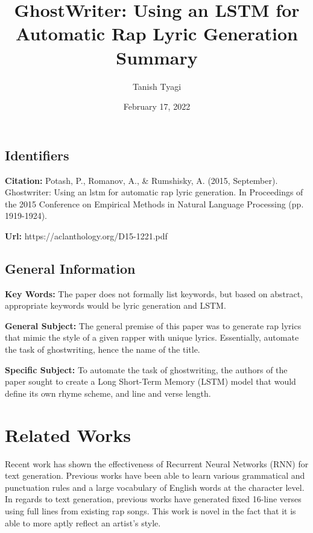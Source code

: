 \documentclass{article}
\title{\textbf{GhostWriter: Using an LSTM for Automatic Rap Lyric Generation Summary}}
\author{Tanish Tyagi}
\date{February 17, 2022}
\begin{document}
\maketitle

\begin{item}
\section{Identifiers}
\item \textbf{Citation:} Potash, P., Romanov, A., & Rumshisky, A. (2015, September). Ghostwriter: Using an lstm for automatic rap lyric generation. In Proceedings of the 2015 Conference on Empirical Methods in Natural Language Processing (pp. 1919-1924).
\item \textbf{Url:} https://aclanthology.org/D15-1221.pdf
\end{item}

\begin{item}
\section{General Information}

\item \textbf{Key Words:} The paper does not formally list keywords, but based on abstract, appropriate keywords would be lyric generation and LSTM. 

\item \textbf{General Subject:} The general premise of this paper was to generate rap lyrics that mimic the style of a given rapper with unique lyrics. Essentially, automate the task of ghostwriting, hence the name of the title.

\item \textbf{Specific Subject:} To automate the task of ghostwriting, the authors of the paper sought to create a Long Short-Term Memory (LSTM) model that would define its own rhyme scheme, and line and verse length. 

\end{item}

\section{Related Works}
Recent work has shown the effectiveness of Recurrent Neural Networks (RNN) for text generation. Previous works have been able to learn various grammatical and punctuation rules and a large vocabulary of English words at the character level. In regards to text generation, previous works have generated fixed 16-line verses using full lines from existing rap songs. This work is novel in the fact that it is able to more aptly reflect an artist's style.
\end{document}
